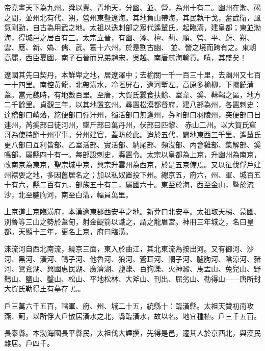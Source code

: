 
\begin{pinyinscope}

 帝堯畫天下為九州。舜以冀、青地天，分幽、並、營，為州十有二。幽州在渤、碣之間，並州北有代、朔，營州東暨遼海。其地負山帶海，其民執干戈，奮武衛，風氣剛勁，自古為用武之地。太祖以迭刺部之眾代遙輦氏，起臨潢，建皇都；東並渤海，得城邑之居百有三。太宗立晉，有幽、涿、檀、薊、順、營、平、蔚、朔、雲、應、新、媯、儒、武、寰十六州，於是割古幽、
 並、營之境而跨有之。東朝高麗，西臣夏國，南子石晉而兄弟趙宋，吳越、南唐航海輸貢。嘻，其盛矣！



 遼國其先曰契丹，本鮮卑之地，居遼澤中；去榆關一千一百三十里，去幽州又七百一十四里。南控黃龍，北帶潢水，冷陘屏右，遼河塹左。高原多榆柳，下隰饒蒲葦。當元魏時，有地數百里。至唐，大賀氏蠶食扶餘、室韋、奚、靺鞨之區，地方二千餘里。貞觀三年，以其地置玄州。尋置松漠都督府，建八部為州，各置刺史：達稽部曰峭落，紇便部曰彈汗州，獨活部曰無逢州，芬阿部曰羽陵州，突便部曰日連州，芮奚部曰徒河州，墜斤部曰萬丹州，伏部曰匹黎、
 赤山二州。以大賀氏窟哥為使持節十州軍事。分州建官，蓋昉於此。迨於五代，闢地東西三千里。遙輦氏更八部曰互利皆部、乙室活部、實活部、納尾部、頻沒部、內會雞部、集解部、奚嗢部，屬縣四十有一。每部設刺史，縣置令。太宗以皇都為上京，升幽州為南京，改南京為東京，聖宗城中京，興宗升雲州為西京，於是五京備焉。又以征伐俘戶建州襟耍之地，多因舊居名之；加以私奴置投下州。總京五，府六，州、軍、城百五十有六，縣二百有九，部族五十有二，屬國六十。東至於海，西至金山，暨於流沙，北至臚朐河，南至白溝，幅員萬里。



 上京道上京臨潢府，本漢遼東郡西安平之地。新莽曰北安平。太祖取天梯、蒙國、別魯等三山之勢於葦甸，射金齪箭以識之，謂之龍眉宮。神冊三年城之，名曰皇都。天顯十三年，更名上京，府曰臨潢。



 淶流河自西北南流，繞京三面，東入於曲江，其北東流為按出河。又有御河、沙河、黑河、潢河、鴨子河、他魯河、狼河、蒼耳河、輞子河、臚朐河、陰涼河、豬河、鴛鴦湖、興國惠民湖、廣濟湖、鹽濼、百狗濼、火神澱、馬盂山、兔兒山、野鵲山、鹽山、鑿山、松山、平地松林、大斧山、刊出、屈劣山、勒得山——唐所封大賀氏勒得王有墓存
 焉。



 戶三萬六千五百，轄軍、府、州、城二十五，統縣十：臨潢縣。太祖天贊初南攻燕、薊，以所俘大戶散居潢水之北，縣臨潢水，故以名。地宜種植。戶三千五百。



 長泰縣。本渤海國長平縣民，太祖伐大諲撰，先得是邑，遷其人於京西北，與漢民雜居。戶四千。




\end{pinyinscope}
